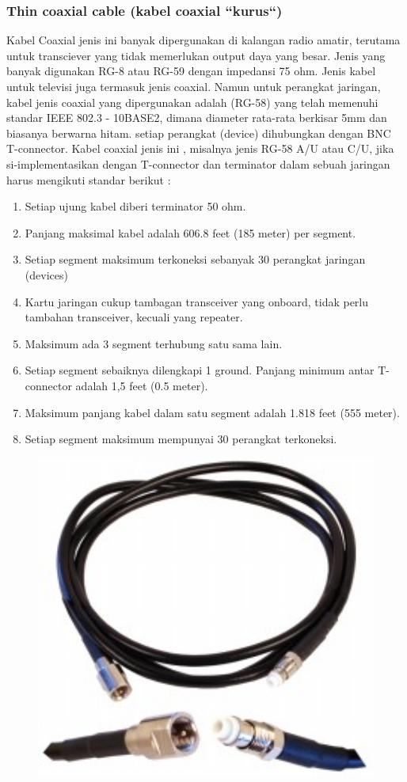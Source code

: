 \begin{itemize}
		\subsubsection{Thin coaxial cable (kabel coaxial ``kurus``)}
		Kabel Coaxial jenis ini banyak dipergunakan di kalangan radio amatir, terutama untuk transciever yang tidak memerlukan output daya yang besar. Jenis yang banyak digunakan RG-8 atau RG-59 dengan impedansi 75 ohm. Jenis kabel untuk televisi juga termasuk jenis coaxial.
		Namun untuk perangkat jaringan, kabel jenis coaxial yang dipergunakan adalah (RG-58) yang telah memenuhi standar IEEE 802.3 - 10BASE2, dimana diameter rata-rata berkisar 5mm dan biasanya berwarna hitam. setiap perangkat (device) dihubungkan dengan BNC T-connector.
		Kabel coaxial jenis ini , misalnya jenis RG-58 A/U atau C/U, jika si-implementasikan dengan T-connector dan terminator dalam sebuah jaringan harus mengikuti standar berikut :
			\begin{enumerate}
				\item Setiap ujung kabel diberi terminator 50 ohm.
				\item Panjang maksimal kabel adalah 606.8 feet (185 meter) per segment.
				\item Setiap segment maksimum terkoneksi sebanyak 30 perangkat jaringan (devices)
				\item Kartu jaringan cukup tambagan transceiver yang onboard, tidak perlu tambahan transceiver, kecuali yang repeater.
				\item Maksimum ada 3 segment terhubung satu sama lain.
				\item Setiap segment sebaiknya dilengkapi 1 ground.
				Panjang minimum antar T-connector adalah 1,5 feet (0.5 meter).
				\item Maksimum panjang kabel dalam satu segment adalah 1.818 feet (555 meter).
				\item Setiap segment maksimum mempunyai 30 perangkat terkoneksi.
			\end{enumerate}
\begin{figure} [ht]
	\centerline{\includegraphics[width=1\textwidth]{figures/thincoax.jpg}}

\end{figure}
\end{itemize}
